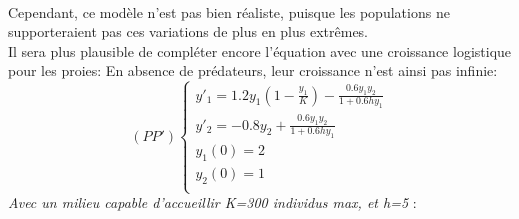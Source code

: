 \documentclass[a4paper,12pt,landscape]{article}
\begin{document}
\begin{table}[h!]
\begin{tabular}{ccl}
\\
\end{tabular}
\end{table}\\	
Cependant, ce modèle n'est pas bien réaliste, puisque les populations ne supporteraient pas ces variations de plus en plus extrêmes. \\

Il sera plus plausible de compléter encore l'équation avec une croissance logistique pour les proies: En absence de prédateurs, leur croissance n'est ainsi pas infinie: 
$$
(PP')
\left \{
\begin{array}{l}
	y'_1=1.2y_1(1-\frac{y_1}{K})-\frac{0.6y_1y_2}{1+0.6hy_1}\\
	y'_2=-0.8y_2+\frac{0.6y_1y_2}{1+0.6hy_1}\\
	y_1(0)=2\\
	y_2(0)=1\\
\end{array}
\right.$$
\textit{Avec un milieu capable d'accueillir K=300 individus max, et h=5} :\\
\end{document}
